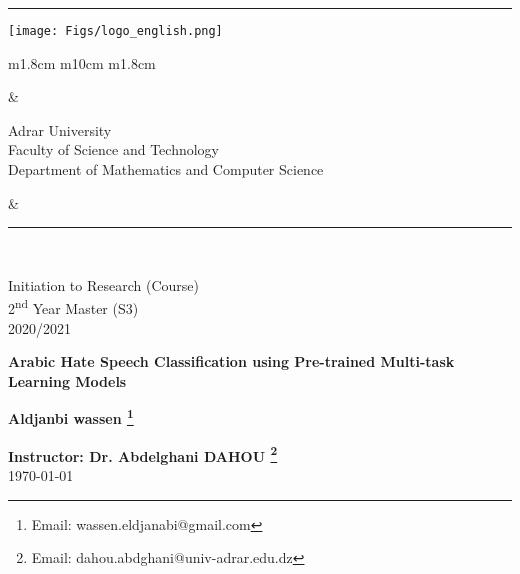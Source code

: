 \documentclass[paper=a4, fontsize=11pt]{scrartcl}
\numberwithin{equation}{section}		%
\numberwithin{figure}{section}			%
\numberwithin{table}{section}				%
\newcommand{\horrule}[1]{\rule{\linewidth}{#1}} 	%
\begin{document}
		
{\flushleft\horrule{2pt}
\begin{center}
{\texttt{[image: Figs/logo\_english.png]}} 
\begin{tabular}{ m{1.8cm} m{10cm} m{1.8cm}}
\begin{center}
\end{center}
&
\begin{center} 
{\small
{Adrar University} \\
{Faculty of Science and Technology} \\
{Department of Mathematics and Computer Science}} \\

\end{center}
&

\begin{center}
\end{center}
\end{tabular}
\end{center}
\flushleft \horrule{2pt}\\[1cm]
}


\begin{center}

{
\huge  
Initiation to Research (Course) \\
\vspace{0.2cm}
2\textsuperscript{nd} Year Master (S3) \\
\vspace{0.2cm}
2020/2021}\\

\vspace{1cm}

{
\Huge   
\textbf{Arabic Hate Speech Classification using Pre-trained Multi-task Learning Models }}\\
\vspace{1cm}

{
\Large
\textbf{Aldjanbi wassen \footnote{Email: wassen.eldjanabi@gmail.com}  }}\\
\vspace{3cm}

{
\large
\textbf{Instructor: Dr. Abdelghani DAHOU \footnote{Email: dahou.abdghani@univ-adrar.edu.dz}}}\\
\today
\end{center}
\pagebreak
\tableofcontents
\pagebreak
\listoffigures
\pagebreak
\listoftables
\pagebreak
\end{document}
